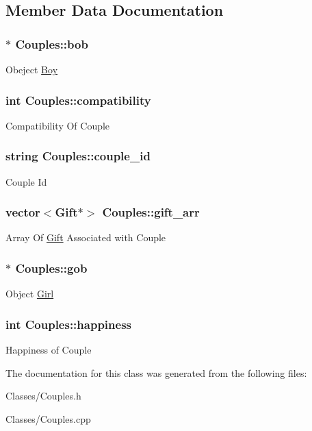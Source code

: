 \subsection{Member Data Documentation}
\hypertarget{class_couples_a958e30179ae954b9a661189bf3fb0ba2}{
\subsubsection[{bob}]{$\ast$ Couples\-::bob}}\label{class_couples_a958e30179ae954b9a661189bf3fb0ba2}
Obeject \hyperlink{class_boy}{Boy} \hypertarget{class_couples_aaa4242b0d809e3a5688e9ad88ba15d52}{
\subsubsection[{compatibility}]{\setlength{\rightskip}{0pt plus 5cm}int Couples\-::compatibility}}\label{class_couples_aaa4242b0d809e3a5688e9ad88ba15d52}
Compatibility Of Couple \hypertarget{class_couples_a7391cf4c54dc2da720263f2b066167d0}{
\subsubsection[{couple\-\_\-id}]{\setlength{\rightskip}{0pt plus 5cm}string Couples\-::couple\-\_\-id}}\label{class_couples_a7391cf4c54dc2da720263f2b066167d0}
Couple Id \hypertarget{class_couples_ae6d39ee74b3832f11546c831e074d821}{
\subsubsection[{gift\-\_\-arr}]{\setlength{\rightskip}{0pt plus 5cm}vector$<${\bf Gift}$\ast$$>$ Couples\-::gift\-\_\-arr}}\label{class_couples_ae6d39ee74b3832f11546c831e074d821}
Array Of \hyperlink{class_gift}{Gift} Associated with Couple \hypertarget{class_couples_acc2ce9df943ae80302c0fc379dce508d}{
\subsubsection[{gob}]{$\ast$ Couples\-::gob}}\label{class_couples_acc2ce9df943ae80302c0fc379dce508d}
Object \hyperlink{class_girl}{Girl} \hypertarget{class_couples_a09ea2aef16ac6fb58055d3e39060e2ce}{
\subsubsection[{happiness}]{\setlength{\rightskip}{0pt plus 5cm}int Couples\-::happiness}}\label{class_couples_a09ea2aef16ac6fb58055d3e39060e2ce}
Happiness of Couple 

The documentation for this class was generated from the following files\-:\begin{DoxyCompactItemize}
\item 
Classes/Couples.\-h\item 
Classes/Couples.\-cpp\end{DoxyCompactItemize}
